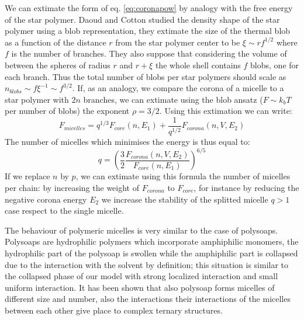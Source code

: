 \documentclass[12pt,a4paper,notitlepage]{article}
\begin{document}
We can extimate the form of eq. \ref{eq:coronapow} by analogy with the
free energy of the star polymer. Daoud and Cotton studied the density
shape of the star polymer using a blob representation\cite{Daoud1982},
they extimate the size of the thermal blob as a function of the distance
$r$ from the star polymer center to be $\xi \sim r f^{1/2}$  where $f$
is the number of branches. They also suppose that considering the volume
of between the spheres of radius $r$ and $r + \xi$ the whole shell
contains $f$ blobs, one for each branch. Thus the total number of
blobs per star polymers should scale as $n_{blobs} \sim f \xi^{-1}
\sim f^{3/2}$. If, as an analogy, we compare the corona of a micelle
to a star polymer with $2 n$ branches, we can extimate using the blob
ansatz ($F \sim k_b T$ per number of blobs) the exponent $\rho =
3/2$. Using this extimation we can write:
\begin{equation}
F_{micelles} = q^{1/3} F_{core}(n, E_1) + 
\frac{1}{q^{1/2}}F_{corona}(n, V, E_2)
\end{equation}
The number of micelles which minimises the energy is thus equal to:
\begin{equation}
  q = \left( \frac{3}{2} 
    \frac{F_{corona}(n, V, E_2)}{F_{core}(n, E_1)} \right)^{6/5}
\end{equation}
If we replace $n$ by $p$, we can extimate using this formula the
number of micelles per chain: by increasing the weight of $F_{corona}$
to $F_{core}$, for instance by reducing the negative corona energy
$E_2$ we increase the stability of the splitted micelle $q > 1$ case
respect to the single micelle.

The behaviour of polymeric micelles is very similar to the case of
polysoaps. Polysoaps are hydrophilic polymers which
incorporate amphiphilic monomers, the hydrophilic part of the polysoap
is swollen while the amphiphilic part is collapsed due to the
interaction with the solvent by definition; this situation is similar
to the collapsed phase of our model with strong localized interaction
and small uniform interaction. It has been shown that also polysoap
forms micelles of different size and number, also the interactions
their interactions of the micelles between each other give place to
complex ternary structures\cite{Borisov1996,Borisov1997}.
\end{document}
